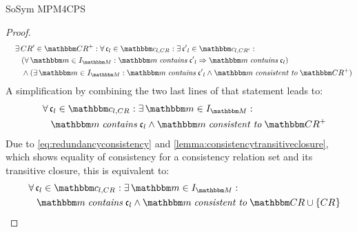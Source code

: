 \begin{copiedFrom}{SoSym MPM4CPS}
\begin{proof}
\begin{align*}
        \formulaskip & \nonumber 
        \exists \consistencyrelation{CR'}{} \in \transitiveclosure{\consistencyrelationset{CR}} : \forall \conditionelement{c}{l} \in \condition{c}{l, \consistencyrelation{CR}{}} : \exists \conditionelement{c'}{l} \in \condition{c}{l,\consistencyrelation{CR'}{}} : \\
        & \formulaskip
        (\forall \modelset{m} \in \metamodelinstances{\metamodelset{M}} : \modelset{m} \containsmath \conditionelement{c'}{l} \Rightarrow \modelset{m} \containsmath \conditionelement{c}{l}) \\
        & \formulaskip
        \land (\exists \modelset{m} \in \metamodelinstances{\metamodelset{M}} :
        \modelset{m} \containsmath \conditionelement{c'}{l} \land \modelset{m} \mathtext{consistent to} \transitiveclosure{\consistencyrelationset{CR}})
    \end{align*}
    A simplification by combining the two last lines of that statement leads to:
    \begin{align*}
        \formulaskip & \nonumber 
        \forall \conditionelement{c}{l} \in \condition{c}{l, \consistencyrelation{CR}{}} : \exists \modelset{m} \in \metamodelinstances{\metamodelset{M}} : \\
        & \formulaskip
        \modelset{m} \containsmath \conditionelement{c}{l} \land \modelset{m} \consistenttomath \transitiveclosure{\consistencyrelationset{CR}}
    \end{align*}
    Due to \autoref{eq:redundancyconsistency} and \autoref{lemma:consistencytransitiveclosure}, which shows equality of consistency for a consistency relation set and its transitive closure, this is equivalent to:
    \begin{align} \label{eq:redundancycompatiblenew}
        \formulaskip & \nonumber 
        \forall \conditionelement{c}{l} \in \condition{c}{l, \consistencyrelation{CR}{}} : \exists \modelset{m} \in \metamodelinstances{\metamodelset{M}} : \\
        & \formulaskip
        \modelset{m} \containsmath \conditionelement{c}{l} \land \modelset{m} \consistenttomath \consistencyrelationset{CR} \cup \setted{\consistencyrelation{CR}{}}
    \end{align}

\end{proof}
\end{copiedFrom}
